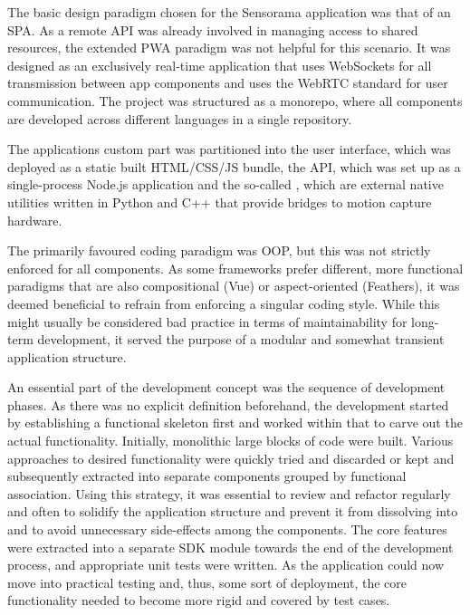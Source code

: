 The basic design paradigm chosen for the Sensorama application was that of an \ac{SPA}.
As a remote API was already involved in managing access to shared resources, the extended \ac{PWA} paradigm was not helpful for this scenario.
It was designed as an exclusively real-time application that uses WebSockets for all transmission between app components and uses the WebRTC standard for user communication.
The project was structured as a monorepo, where all components are developed across different languages in a single repository.

The application\textquotesingle s custom part was partitioned into the user interface, which was deployed as a static built \ac{HTML}/\ac{CSS}/\ac{JS} bundle, the \ac{API}, which was set up as a single-process Node.js application and the so-called , which are external native utilities written in Python and C++ that provide bridges to motion capture hardware.

The primarily favoured coding paradigm was \ac{OOP}, but this was not strictly enforced for all components.
As some frameworks prefer different, more functional paradigms that are also compositional (Vue) or aspect-oriented (Feathers), it was deemed beneficial to refrain from enforcing a singular coding style.
While this might usually be considered bad practice in terms of maintainability for long-term development, it served the purpose of a modular and somewhat transient  application structure.

An essential part of the development concept was the sequence of development phases.
As there was no explicit definition beforehand, the development started by establishing a functional skeleton first and worked within that to carve out the actual functionality.
Initially, monolithic large blocks of code were built. Various approaches to desired functionality were quickly tried and discarded or kept and subsequently extracted into separate components grouped by functional association.
Using this strategy, it was essential to review and refactor regularly and often to solidify the application structure and prevent it from dissolving into  and to avoid unnecessary side-effects among the components.
The core features were extracted into a separate \ac{SDK} module towards the end of the development process, and appropriate unit tests were written.
As the application could now move into practical testing and, thus, some sort of  deployment, the core functionality needed to become more rigid and covered by test cases.

